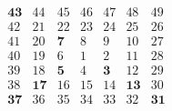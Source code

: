 \documentclass{article}
\begin{document}
	\begin{equation*}
		\begin{matrix}
			\mathbf{43} & 44          & 45         & 46 & 47         & 48          & 49          \\
			42          & 21          & 22         & 23 & 24         & 25          & 26          \\
			41          & 20          & \mathbf{7} & 8  & 9          & 10          & 27          \\
			40          & 19          & 6          & 1  & 2          & 11          & 28          \\
			39          & 18          & \mathbf{5} & 4  & \mathbf{3} & 12          & 29          \\
			38          & \mathbf{17} & 16         & 15 & 14         & \mathbf{13} & 30          \\
			\mathbf{37} & 36          & 35         & 34 & 33         & 32          & \mathbf{31}
		\end{matrix}
	\end{equation*}
\end{document}
